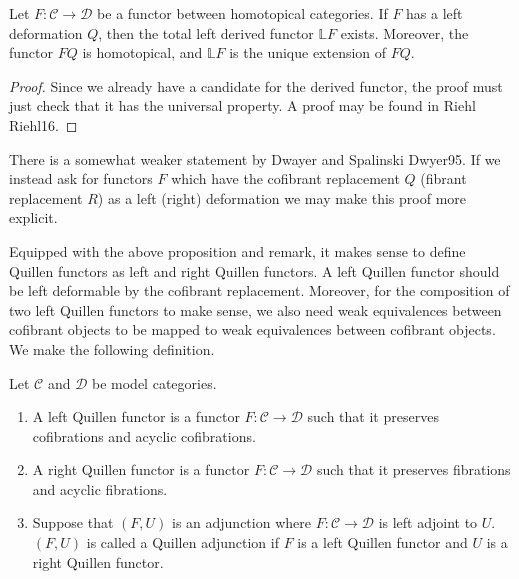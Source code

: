 \documentclass[../thesis.tex]{subfiles}
\begin{document}
            \begin{proposition}
                Let $F:\mathcal{C}\rightarrow\mathcal{D}$ be a functor between homotopical categories. If $F$ has a left deformation $Q$, then the total left derived functor $\mathbb{L}F$ exists. Moreover, the functor $FQ$ is homotopical, and $\mathbb{L}F$ is the unique extension of $FQ$.
            \end{proposition}

            \begin{proof}
                Since we already have a candidate for the derived functor, the proof must just check that it has the universal property. A proof may be found in Riehl \cite[Proposition 6.4.11]{207}{Riehl16}.
            \end{proof}

            \begin{remark}
                There is a somewhat weaker statement by Dwayer and Spalinski \cite[Proposition 9.3]{111}{Dwyer95}. If we instead ask for functors $F$ which have the cofibrant replacement $Q$ (fibrant replacement $R$) as a left (right) deformation we may make this proof more explicit.
            \end{remark}

            Equipped with the above proposition and remark, it makes sense to define Quillen functors as left and right Quillen functors. A left Quillen functor should be left deformable by the cofibrant replacement. Moreover, for the composition of two left Quillen functors to make sense, we also need weak equivalences between cofibrant objects to be mapped to weak equivalences between cofibrant objects. We make the following definition.

            \begin{definition}
                Let $\mathcal{C}$ and $\mathcal{D}$ be model categories. \begin{enumerate}
                    \item A left Quillen functor is a functor $F:\mathcal{C}\rightarrow\mathcal{D}$ such that it preserves cofibrations and acyclic cofibrations.
                    \item A right Quillen functor is a functor $F:\mathcal{C}\rightarrow\mathcal{D}$ such that it preserves fibrations and acyclic fibrations.
                    \item Suppose that $(F,U)$ is an adjunction where $F:\mathcal{C}\rightarrow\mathcal{D}$ is left adjoint to $U$. $(F,U)$ is called a Quillen adjunction if $F$ is a left Quillen functor and $U$ is a right Quillen functor.
                \end{enumerate}
            \end{definition}
\end{document}
